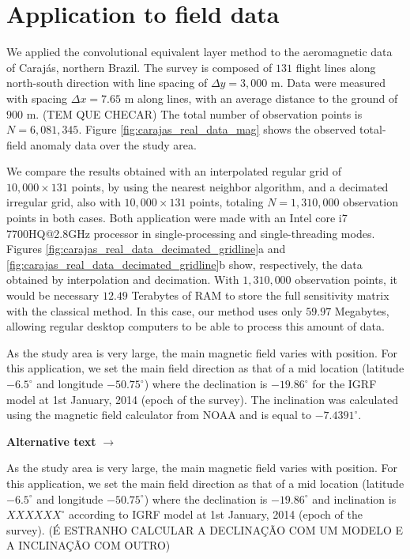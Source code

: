 \section{Application to field data}

We applied the convolutional equivalent layer method to the aeromagnetic data of Carajás, 
northern Brazil.
The survey is composed of $131$ flight lines along north-south direction with line spacing of 
$\Delta y = 3,000$ m. 
Data were measured with spacing $\Delta x = 7.65$ m along lines, with an average distance 
to the ground of $900$ m. (TEM QUE CHECAR)
The total number of observation points is $N = 6,081,345$. Figure \ref{fig:carajas_real_data_mag} 
shows the observed total-field anomaly data over the study area.

We compare the results obtained with an interpolated regular grid of $10,000 \times 131$ points, 
by using the nearest neighbor algorithm, and a decimated irregular grid, also with $10,000 \times 131$
points, totaling $N = 1,310,000$ observation points in both cases. 
Both application were made with an Intel core i7 7700HQ@2.8GHz processor in single-processing and 
single-threading modes. 
Figures \ref{fig:carajas_real_data_decimated_gridline}a and 
\ref{fig:carajas_real_data_decimated_gridline}b show, respectively, the data obtained by interpolation
and decimation. 
With $1,310,000$ observation points, it would be necessary $12.49$ Terabytes of RAM to store the full
sensitivity matrix with the classical method. 
In this case, our method uses only $59.97$ Megabytes, allowing regular desktop computers to be able 
to process this amount of data.

As the study area is very large, the main magnetic field varies with position.
For this application, we set the main field direction as that of a mid location 
(latitude $-6.5^{\circ}$ and longitude $-50.75^{\circ}$) where the declination is $-19.86^{\circ}$ 
for the IGRF model at 1st January, 2014 (epoch of the survey). The inclination was calculated using the magnetic field calculator from NOAA and is equal to $-7.4391^{\circ}$. 

\textbf{Alternative text} $\rightarrow$

As the study area is very large, the main magnetic field varies with position.
For this application, we set the main field direction as that of a mid location 
(latitude $-6.5^{\circ}$ and longitude $-50.75^{\circ}$) where the declination is $-19.86^{\circ}$ 
and inclination is $XXXXXX^{\circ}$ according to IGRF model at 1st January, 2014 (epoch of the survey).
(É ESTRANHO CALCULAR A DECLINAÇÃO COM UM MODELO E A INCLINAÇÃO COM OUTRO)

